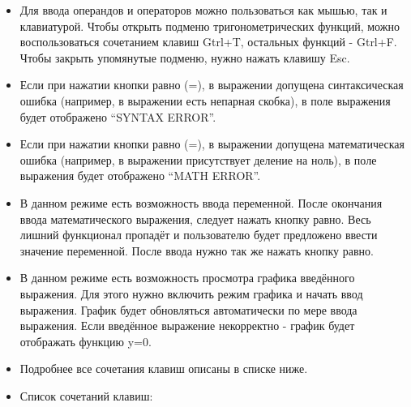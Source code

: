 \documentclass[
]{article}
\begin{document}
\begin{itemize}
\item
  Для ввода операндов и операторов можно пользоваться как мышью, так и
  клавиатурой. Чтобы открыть подменю тригонометрических функций, можно
  воспользоваться сочетанием клавиш Gtrl+T, остальных функций - Gtrl+F.
  Чтобы закрыть упомянутые подменю, нужно нажать клавишу Esc.
\item
  Если при нажатии кнопки равно (=), в выражении допущена синтаксическая
  ошибка (например, в выражении есть непарная скобка), в поле выражения
  будет отображено ``SYNTAX ERROR''.
\item
  Если при нажатии кнопки равно (=), в выражении допущена математическая
  ошибка (например, в выражении присутствует деление на ноль), в поле
  выражения будет отображено ``MATH ERROR''.
\item
  В данном режиме есть возможность ввода переменной. После окончания
  ввода математического выражения, следует нажать кнопку равно. Весь
  лишний функционал пропадёт и пользователю будет предложено ввести
  значение переменной. После ввода нужно так же нажать кнопку равно.
\item
  В данном режиме есть возможность просмотра графика введённого
  выражения. Для этого нужно включить режим графика и начать ввод
  выражения. График будет обновляться автоматически по мере ввода
  выражения. Если введённое выражение некорректно - график будет
  отображать функцию y=0.
\item
  Подробнее все сочетания клавиш описаны в списке ниже.
\item
  Список сочетаний клавиш:


\end{itemize}
\end{document}
